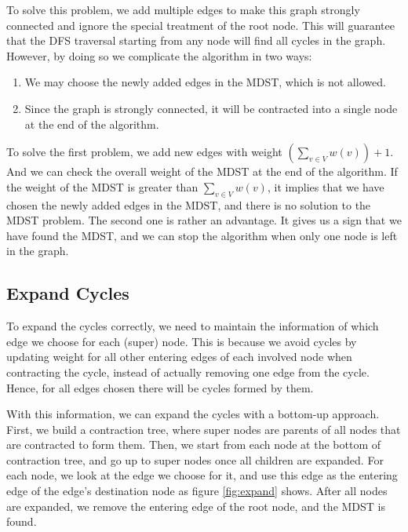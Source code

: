 \documentclass[a4paper,12pt]{article}
\begin{document}
To solve this problem, we add multiple edges to make this graph strongly connected and ignore the special treatment of the root node.
This will guarantee that the DFS traversal starting from any node will find all cycles in the graph.
However, by doing so we complicate the algorithm in two ways:
\begin{enumerate}
	\item We may choose the newly added edges in the MDST, which is not allowed.
	\item Since the graph is strongly connected, it will be contracted into a single node at the end of the algorithm.
\end{enumerate}

To solve the first problem, we add new edges with weight $\left(\sum_{v \in V} w(v)\right) + 1$.
And we can check the overall weight of the MDST at the end of the algorithm.
If the weight of the MDST is greater than $\sum_{v \in V} w(v)$, it implies that we have chosen the newly added edges in the MDST, and there is no solution to the MDST problem.
The second one is rather an advantage.
It gives us a sign that we have found the MDST, and we can stop the algorithm when only one node is left in the graph.

\subsection*{Expand Cycles}

To expand the cycles correctly, we need to maintain the information of which edge we choose for each (super) node.
This is because we avoid cycles by updating weight for all other entering edges of each involved node when contracting the cycle, instead of actually removing one edge from the cycle.
Hence, for all edges chosen there will be cycles formed by them.

With this information, we can expand the cycles with a bottom-up approach.
First, we build a contraction tree, where super nodes are parents of all nodes that are contracted to form them.
Then, we start from each node at the bottom of contraction tree, and go up to super nodes once all children are expanded.
For each node, we look at the edge we choose for it, and use this edge as the entering edge of the edge's destination node as figure \ref{fig:expand} shows.
After all nodes are expanded, we remove the entering edge of the root node, and the MDST is found.
\end{document}
